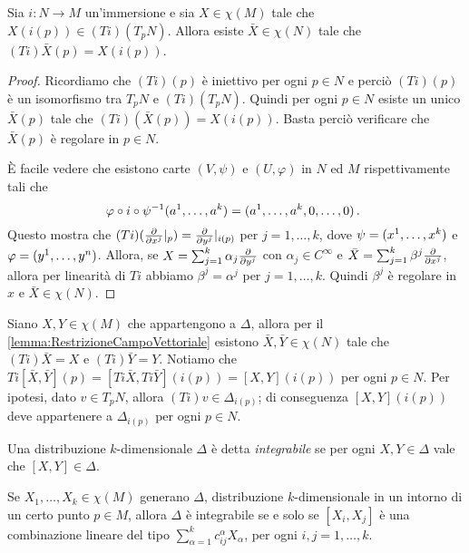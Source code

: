 \begin{lemma}\label{lemma:RestrizioneCampoVettoriale}
	Sia $i:N\to M$ un'immersione e sia $X\in\chi(M)$ tale che
	$X(i(p))\in (Ti)(T_pN)$. Allora esiste $\bar X\in\chi(N)$ tale che $(Ti)\bar X (p) = X(i(p))$.
\end{lemma}

\begin{proof}
	Ricordiamo che $(Ti)(p)$ è iniettivo per ogni $p\in N$ e perciò $(Ti)(p)$ è un isomorfismo tra $T_pN$ e $(Ti)(T_pN)$. Quindi per ogni $p\in N$ esiste un unico $\bar X(p)$ tale che $(Ti)(\bar X(p)) = X(i(p))$. Basta perciò verificare che $\bar X(p)$ è regolare in $p\in N$.
	
	È facile vedere che esistono carte $(V,\psi)$ e $(U,\varphi)$ in $N$ ed $M$ rispettivamente tali che
	\begin{equation*}
	\varphi\circ i \circ\psi^{-1}(a^1,\ldots, a^k) = (a^1,\ldots,a^k,0,\ldots,0)\punto
	\end{equation*}
	Questo mostra che $(Ti)(\DerParz{}{x^j}\restrict{p}) = \DerParz{}{y^j}\restrict{i(p)}$ per $j=1,\ldots,k$, dove $\psi = (\seqa xk,)$ e $\varphi = (\seqa yn,)$.
	Allora, se $X=\sum_{j=1}^k\alpha_j\DerParz{}{y^j}$ con $\alpha_j\in C^\infty$ e $\bar X = \sum_{j=1}^k\beta^j\DerParz{}{x^j}$, allora per linearità di $Ti$ abbiamo $\beta^j=\alpha^j$ per $j=1,\ldots,k$. Quindi $\beta^j$ è regolare in $x$ e $\bar X\in\chi(N)$.
\end{proof}

Siano $X,Y\in\chi(M)$ che appartengono a $\Delta$, allora per il \cref{lemma:RestrizioneCampoVettoriale} esistono $\bar X,\bar Y\in\chi(N)$ tale che $(Ti)\bar X=X$ e $(Ti)\bar Y=Y$.
Notiamo che $Ti[\bar X,\bar Y](p) = [Ti\bar X,Ti\bar Y](i(p)) = [X,Y] (i(p))$ per ogni $p\in N$. Per ipotesi, dato $v\in T_pN$, allora $(Ti)v\in\Delta_{i(p)}$; di conseguenza $[X,Y](i(p))$ deve appartenere a $\Delta_{i(p)}$ per ogni $p\in N$. %

\begin{definition} 
	Una distribuzione $k$-dimensionale $\Delta$ è detta \emph{integrabile} se per ogni $X,Y\in\Delta$ vale che $[X,Y]\in\Delta$.
\end{definition}

\begin{proposition} \label{prop:CondizioneIntegrabilitaDistribuzioniDaGeneratori}
	Se $X_1,\ldots,X_k\in\chi(M)$ generano $\Delta$, distribuzione $k$-dimensionale in un intorno di un certo punto $p\in M$, allora $\Delta$ è integrabile se e solo se $[X_i,X_j]$ è una combinazione lineare del tipo $\sum_{\alpha=1}^kc_{ij}^\alpha X_\alpha$, per ogni $i,j=1,\ldots,k$.
\end{proposition}

